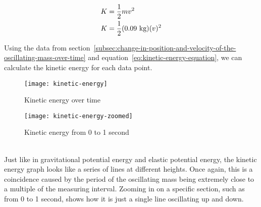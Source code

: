 \documentclass[titlepage]{article}
\begin{document}
                \begin{equation}
                    \begin{aligned}
                        \small
                        K &= \frac{1}{2}mv^2 \\
                        K &= \frac{1}{2}(0.09 \text{ kg})(v)^2 \\
                    \end{aligned}\label{eq:kinetic-energy-equation}
                \end{equation}
                
                Using the data from section~\ref{subsec:change-in-position-and-velocity-of-the-oscillating-mass-over-time} and equation~\ref{eq:kinetic-energy-equation}, we can calculate the kinetic energy for each data point.
                
                \begin{minipage}{0.5\textwidth}
                    \begin{figure}[H]
                        \centering
                        \texttt{[image: kinetic-energy]}
                        \caption{Kinetic energy over time}
                        \label{fig:kinetic-energy}
                    \end{figure}
                \end{minipage}%
                \begin{minipage}{0.5\textwidth}
                    \begin{figure}[H]
                        \centering
                        \texttt{[image: kinetic-energy-zoomed]}
                        \caption{Kinetic energy from 0 to 1 second}
                        \label{fig:kinetic-energy-zoomed}
                    \end{figure}
                \end{minipage}\\
                
                Just like in gravitational potential energy and elastic potential energy, the kinetic energy graph looks like a series of lines at different heights.
                Once again, this is a coincidence caused by the period of the oscillating mass being extremely close to a multiple of the measuring interval.
                Zooming in on a specific section, such as from 0 to 1 second, shows how it is just a single line oscillating up and down.
            
\end{document}
